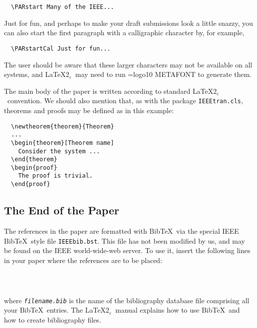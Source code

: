 \documentclass[%
	final,
	notitlepage,
	narroweqnarray,
	inline,
	twoside,
	]{ieee}
\newcommand{\latexiie}{\LaTeX2{\Large$_\varepsilon$}}
\begin{document}
\unskip
\begin{verbatim}
  \PARstart Many of the IEEE...
\end{verbatim}

\PARstartCal Just for fun, and perhaps to make your draft submissions
look a little snazzy, you can also start the first paragraph with a
calligraphic character by, for example,

\unskip
\begin{verbatim}
  \PARstartCal Just for fun...
\end{verbatim}

The user should be aware that these larger characters may not be
available on all systems, and \latexiie\ may need to run
{\font\mf=logo10 \mf METAFONT} to generate them.

The main body of the paper is written according to standard \latexiie\
convention. We should also mention that, as with the package
\texttt{IEEEtran.cls}, theorems and proofs may be defined as in this
example: 
\begin{verbatim}
  \newtheorem{theorem}{Theorem}
  ...
  \begin{theorem}[Theorem name]
    Consider the system ...
  \end{theorem}
  \begin{proof}
    The proof is trivial.
  \end{proof}
\end{verbatim}

\subsection{The End of the Paper}

The references in the paper are formatted with {\sc Bib}\TeX\ via the
special IEEE {\sc Bib}\TeX\ style file \texttt{IEEEbib.bst}. This file
has not been modified by us, and may be found on the IEEE
world-wide-web server.  To use it, insert the following lines in your
paper where the references are to be placed:
\begin{verbatim}
  
  
\end{verbatim}
where \texttt{\emph{filename.bib\/}} is the name of the
bibliography data\-base file comprising all your {\sc Bib}\TeX\ entries.
The \latexiie\ manual explains how to use {\sc Bib}\TeX\ and how to
create bibliography files.
\end{document}
